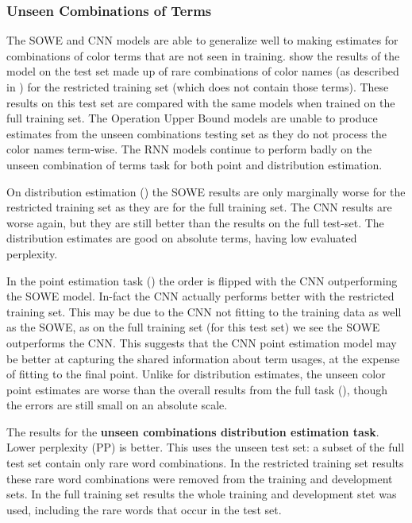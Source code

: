 \documentclass[11pt,a4paper]{article}
\begin{document}
\subsubsection{Unseen Combinations of Terms}
The SOWE and CNN models are able to generalize well to making estimates for combinations of color terms that are not seen in training.
 show the results of the model on the test set made up of rare combinations of color names (as described in ) for the restricted training set (which does not contain those terms).
These results on this test set are compared with the same models when trained on the full training set.
The Operation Upper Bound models are unable to produce estimates from the unseen combinations testing set as they do not process the color names term-wise.
The RNN models continue to perform badly on the unseen combination of terms task for both point and distribution estimation.

On distribution estimation () the SOWE results are only marginally worse for the restricted training set as they are for the full training set.
The CNN results are worse again, but they are still better than the results on the full test-set.
The distribution estimates are good on absolute terms, having low evaluated perplexity.

In the point estimation task () the order is flipped with the CNN outperforming the SOWE model.
In-fact the CNN actually performs better with the restricted training set.
This may be due to the CNN not fitting to the training data as well as the SOWE,
as on the full training set (for this test set) we see the SOWE outperforms the CNN.
This suggests that the CNN point estimation model may be better at capturing the shared information about term usages, at the expense of fitting to the final point.
Unlike for distribution estimates, the unseen color point estimates are worse than the overall results from the full task (), though the errors are still small on an absolute scale.





\begin{table}
	\caption{\label{tbl:distextrapo} The results for the \textbf{unseen combinations distribution estimation task}. Lower perplexity (PP) is better. This uses the unseen test set: a subset of the full test set contain only rare word combinations. In the restricted training set results these rare word combinations were removed from the training and development sets. In the full training set results the whole training and development stet was used, including the rare words that occur in the test set.}
\end{table}
\end{document}
